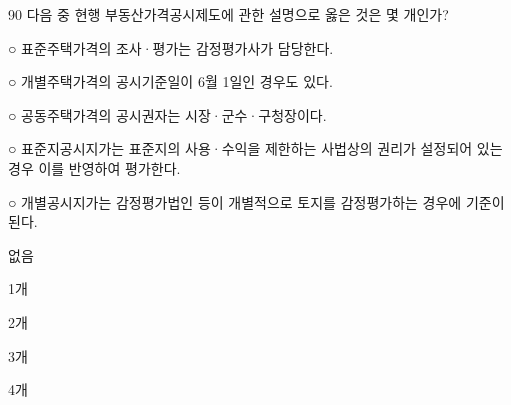 \begin{question}{90}
다음 중 현행 부동산가격공시제도에 관한 설명으로 옳은 것은 몇 개인가?
\begin{framedtext}
○ 표준주택가격의 조사·평가는 감정평가사가 담당한다. \par
○ 개별주택가격의 공시기준일이 6월 1일인 경우도 있다. \par
○ 공동주택가격의 공시권자는 시장·군수·구청장이다. \par
○ 표준지공시지가는 표준지의 사용·수익을 제한하는 사법상의 권리가 설정되어 있는 경우 이를 반영하여 평가한다. \par
○ 개별공시지가는 감정평가법인 등이 개별적으로 토지를 감정평가하는 경우에 기준이 된다. \par
\end{framedtext}
\begin{choices}
  \item 없음
  \item 1개
  \item 2개
  \item 3개
  \item 4개
\end{choices}
\end{question}

